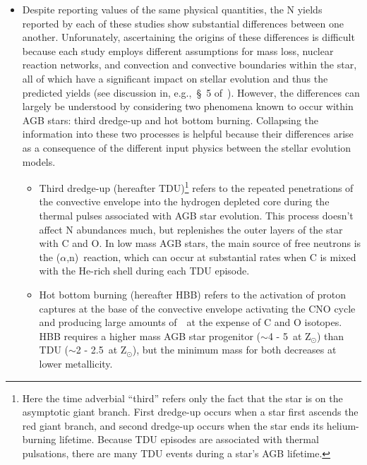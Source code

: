 \documentclass[ms.tex]{subfiles}
\begin{document}
\begin{itemize} 
	\item Despite reporting values of the same physical quantities, the N 
	yields reported by each of these studies show substantial differences 
	between one another. 
	Unforunately, ascertaining the origins of these differences is difficult 
	because each study employs different assumptions for mass loss, nuclear 
	reaction networks, and convection and convective boundaries within the 
	star, all of which have a significant impact on stellar evolution and thus 
	the predicted yields (see discussion in, e.g.,~\S~5 
	of~\citealp{Karakas2016}). 
	However, the differences can largely be understood by considering two 
	phenomena known to occur within AGB stars: third dredge-up and hot bottom 
	burning. 
	Collapsing the information into these two processes is helpful because 
	their differences arise as a consequence of the different input physics 
	between the stellar evolution models. 
	\begin{itemize} 
		\item Third dredge-up (hereafter TDU)\footnote{
			Here the time adverbial ``third'' refers only the fact that the 
			star is on the asymptotic giant branch. 
			First dredge-up occurs when a star first ascends the red giant 
			branch, and second dredge-up occurs when the star ends its 
			helium-burning lifetime. 
			Because TDU episodes are associated with thermal pulsations, there 
			are many TDU events during a star's AGB lifetime. 
		} refers to the repeated penetrations of the convective envelope into 
		the hydrogen depleted core during the thermal pulses associated with 
		AGB star evolution.
		This process doesn't affect N abundances much, but replenishes the 
		outer layers of the star with C and O. 
		In low mass AGB stars, the main source of free neutrons is the 
		\Cthirteen($\alpha$,n)\Osixteen~reaction, which can occur at 
		substantial rates when C is mixed with the He-rich shell during each 
		TDU episode. 

		\item Hot bottom burning (hereafter HBB) refers to the activation of 
		proton captures at the base of the convective envelope activating the 
		CNO cycle and producing large amounts of~\Nfourteen~at the expense of C 
		and O isotopes. 
		HBB requires a higher mass AGB star progenitor ($\sim$4 - 5~\msun at 
		Z$_\odot$) than TDU ($\sim$2 - 2.5~\msun at Z$_\odot$), but the 
		minimum mass for both decreases at lower metallicity. 
	\end{itemize} 


\end{itemize}
\end{document}
